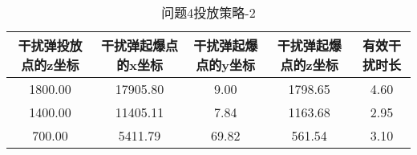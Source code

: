 \documentclass[../main.tex]{subfiles}
\begin{document}
\begin{table}[H]
\caption{问题4投放策略-2}
\label{tab:031} 
\centering
\begin{small}
\begin{tabular}{ccccc}
\toprule[1.5pt]
    干扰弹投放点的z坐标 &干扰弹起爆点的x坐标&干扰弹起爆点的y坐标&干扰弹起爆点的z坐标&有效干扰时长\\
\midrule[1pt]
1800.00             & 17905.80                 & 9.00     & 1798.65                    & 4.60  \\               
1400.00             & 11405.11                 & 7.84     & 1163.68                    & 2.95  \\               
700.00              & 5411.79                  & 69.82    & 561.54                    & 3.10  \\                
\bottomrule[1.5pt]
\end{tabular}
\end{small}
\end{table}
\end{document}
